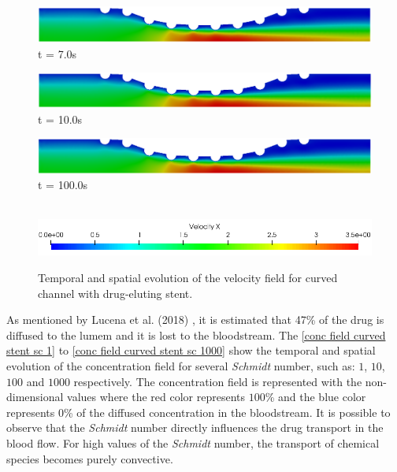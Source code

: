 \begin{figure}[H]
     \begin{minipage}{.50\linewidth}
      \centering
      \includegraphics[scale=0.18]{./02_chaps/cap_solution/figure/vel_CurvedStrut6.png}\\
      t = 7.0s
     \end{minipage}
     \begin{minipage}{.50\linewidth}
     \medskip
      \centering
      \includegraphics[scale=0.18]{./02_chaps/cap_solution/figure/vel_CurvedStrut7.png}\\
      t = 10.0s
     \end{minipage}%
     \begin{minipage}{.50\linewidth}
     \medskip
      \centering
      \includegraphics[scale=0.18]{./02_chaps/cap_solution/figure/vel_CurvedStrut8.png}\\
      t = 100.0s
     \end{minipage}\\[10pt]
      \centering
      \includegraphics[scale=0.5]{./02_chaps/cap_solution/figure/vel_CurvedStrutScale.png}\\
     \medskip
     \caption{
Temporal and spatial evolution of the velocity field for curved channel with
drug-eluting stent.}
     \label{velocity field curved stent}
\end{figure}


\vspace{1cm}
As mentioned by Lucena et al. (2018) \cite{lucena2018}, 
it is estimated that 47\% of the drug is diffused to the 
lumem and it is lost to the bloodstream.
The \ref{conc field curved stent sc 1} to 
\ref{conc field curved stent sc 1000} show the temporal and spatial evolution 
of the concentration field for several \textit{Schmidt} number, 
such as: $1$, $10$, $100$ and $1000$ respectively. The concentration field is 
represented with the non-dimensional values where the red color 
represents $100$\% and the blue color represents $0$\% 
of the diffused concentration in the bloodstream. 
It is possible to observe that the \textit{Schmidt} number directly 
influences the drug transport in the blood flow. 
For high values of the \textit{Schmidt} number, 
the transport of chemical species becomes purely convective.



